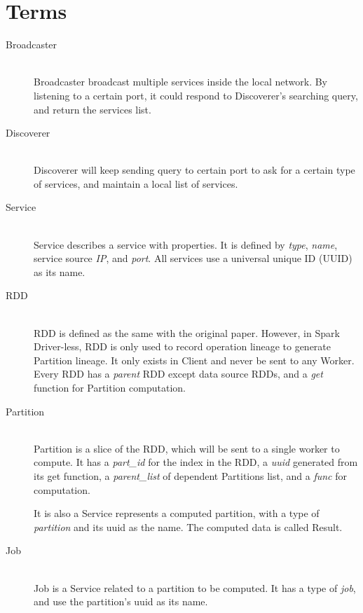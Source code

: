 
\section{Terms} %
\label{sec:terms}


\begin{description}
    \item[Broadcaster] \hfill \\
    Broadcaster broadcast multiple services inside the local network.
    By listening to a certain port, it could respond to Discoverer's searching query, and return the services list.

    \item[Discoverer] \hfill \\
    Discoverer will keep sending query to certain port to ask for a certain type of services,
    and maintain a local list of services.

    \item[Service] \hfill \\
    Service describes a service with properties.
    It is defined by \emph{type}, \emph{name}, service source \emph{IP}, and \emph{port}.
    All services use a universal unique ID (UUID) as its name.

    \item[RDD] \hfill \\
    RDD is defined as the same with the original paper.
    However, in Spark Driver-less, RDD is only used to record operation lineage to generate Partition lineage.
    It only exists in Client and never be sent to any Worker.
    Every RDD has a \emph{parent} RDD except data source RDDs, and a \emph{get} function for Partition computation.

    \item[Partition] \hfill \\
    Partition is a slice of the RDD, which will be sent to a single worker to compute.
    It has a \emph{part\_id} for the index in the RDD,
    a \emph{uuid} generated from its get function,
    a \emph{parent\_list} of dependent Partitions list,
    and a \emph{func} for computation.

    It is also a Service represents a computed partition,
    with a type of \textit{partition} and its uuid as the name.
    The computed data is called Result.

    \item[Job] \hfill \\
    Job is a Service related to a partition to be computed.
    It has a type of \textit{job}, and use the partition's uuid as its name.


\end{description}
